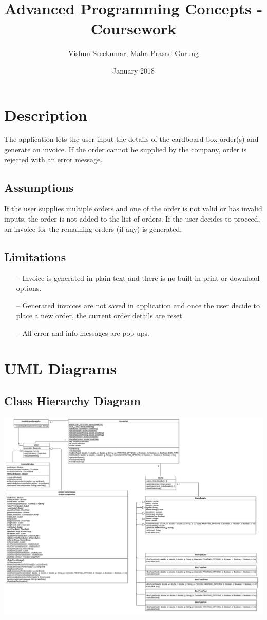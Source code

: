 \documentclass[12pt]{article}
\title{Advanced Programming Concepts - Coursework}
\author{Vishnu Sreekumar, Maha Prasad Gurung}
\date{January 2018} %
\begin{document}
\maketitle
\newpage
\tableofcontents
\newpage

\section{Description}
The application lets the user input the details of the cardboard box order(s) and generate an invoice. If the order cannot be supplied by the company, order is rejected with an error message.

\subsection{Assumptions}
If the user supplies multiple orders and one of the order is not valid or has invalid inputs, the order is not added to the list of orders. If the user decides to proceed, an invoice for the remaining orders (if any) is generated.

\subsection{Limitations}
\begin{enumerate}
	\item[--] Invoice is generated in plain text and there is no built-in print or download options. 
	\item [--] Generated invoices are not saved in application and once the user decide to place a new order, the current order details are reset.
	\item[--] All error and info messages are pop-ups.
\end{enumerate}
\newpage
\section{UML Diagrams}
\subsection{Class Hierarchy Diagram}
\includegraphics[scale=0.13]{./diagrams/ClassHierarchyDiagram.jpg}
\end{document}
